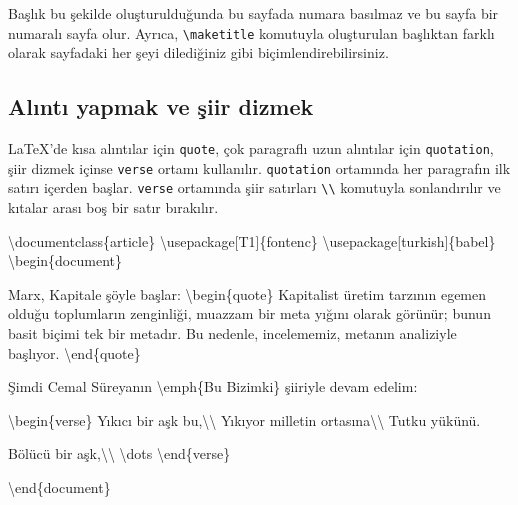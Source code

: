 \documentclass[
  letterpaper,
  DIV=11,
  numbers=noendperiod]{scrreprt}
\newenvironment{Shaded}{\begin{snugshade}}{\end{snugshade}}
\newcommand{\BuiltInTok}[1]{\textcolor[rgb]{0.00,0.23,0.31}{#1}}
\newcommand{\ExtensionTok}[1]{\textcolor[rgb]{0.00,0.23,0.31}{#1}}
\newcommand{\FunctionTok}[1]{\textcolor[rgb]{0.28,0.35,0.67}{#1}}
\newcommand{\KeywordTok}[1]{\textcolor[rgb]{0.00,0.23,0.31}{#1}}
\newcommand{\NormalTok}[1]{\textcolor[rgb]{0.00,0.23,0.31}{#1}}
\begin{document}
Başlık bu şekilde oluşturulduğunda bu sayfada numara basılmaz ve bu
sayfa bir numaralı sayfa olur. Ayrıca,
\texttt{\textbackslash{}maketitle} komutuyla oluşturulan başlıktan
farklı olarak sayfadaki her şeyi dilediğiniz gibi
biçimlendirebilirsiniz.

\hypertarget{alux131ntux131-yapmak-ve-ux15fiir-dizmek}{%
\subsection{Alıntı yapmak ve şiir
dizmek}\label{alux131ntux131-yapmak-ve-ux15fiir-dizmek}}

{\LaTeX}'de kısa alıntılar için \texttt{quote}, çok paragraflı uzun
alıntılar için \texttt{quotation}, şiir dizmek içinse \texttt{verse}
ortamı kullanılır. \texttt{quotation} ortamında her paragrafın ilk
satırı içerden başlar. \texttt{verse} ortamında şiir satırları
\texttt{\textbackslash{}\textbackslash{}} komutuyla sonlandırılır ve
kıtalar arası boş bir satır bırakılır.

\begin{Shaded}
\begin{Highlighting}[]
\BuiltInTok{\textbackslash{}documentclass}\NormalTok{\{}\ExtensionTok{article}\NormalTok{\}}
\BuiltInTok{\textbackslash{}usepackage}\NormalTok{[T1]\{}\ExtensionTok{fontenc}\NormalTok{\}}
\BuiltInTok{\textbackslash{}usepackage}\NormalTok{[turkish]\{}\ExtensionTok{babel}\NormalTok{\}}
\KeywordTok{\textbackslash{}begin}\NormalTok{\{}\ExtensionTok{document}\NormalTok{\}}

\NormalTok{Marx, Kapital\textquotesingle{}e şöyle başlar:}
\KeywordTok{\textbackslash{}begin}\NormalTok{\{}\ExtensionTok{quote}\NormalTok{\}}
\NormalTok{  Kapitalist üretim tarzının egemen olduğu toplumların zenginliği,}
\NormalTok{  \textasciigrave{}muazzam bir meta yığını\textquotesingle{} olarak görünür; bunun basit biçimi tek}
\NormalTok{  bir metadır. Bu nedenle, incelememiz, metanın analiziyle başlıyor.}
\KeywordTok{\textbackslash{}end}\NormalTok{\{}\ExtensionTok{quote}\NormalTok{\}}

\NormalTok{Şimdi Cemal Süreya\textquotesingle{}nın }\FunctionTok{\textbackslash{}emph}\NormalTok{\{Bu Bizimki\} şiiriyle devam edelim:}

\KeywordTok{\textbackslash{}begin}\NormalTok{\{}\ExtensionTok{verse}\NormalTok{\}}
\NormalTok{  Yıkıcı bir aşk bu,}\FunctionTok{\textbackslash{}\textbackslash{}}
\NormalTok{  Yıkıyor milletin ortasına}\FunctionTok{\textbackslash{}\textbackslash{}}
\NormalTok{  Tutku yükünü.}

\NormalTok{  Bölücü bir aşk,}\FunctionTok{\textbackslash{}\textbackslash{}}
  \FunctionTok{\textbackslash{}dots}
\KeywordTok{\textbackslash{}end}\NormalTok{\{}\ExtensionTok{verse}\NormalTok{\}}

\KeywordTok{\textbackslash{}end}\NormalTok{\{}\ExtensionTok{document}\NormalTok{\}}
\end{Highlighting}
\end{Shaded}
\end{document}
